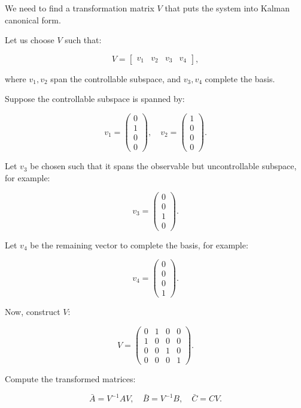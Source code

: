 \documentclass{article}
\begin{document}
We need to find a transformation matrix \( V \) that puts the system into Kalman canonical form.

Let us choose \( V \) such that:

\[
V = \begin{bmatrix}
v_1 & v_2 & v_3 & v_4
\end{bmatrix},
\]

where \( v_1, v_2 \) span the controllable subspace, and \( v_3, v_4 \) complete the basis.

Suppose the controllable subspace is spanned by:

\[
v_1 = \begin{pmatrix}
0 \\ 1 \\ 0 \\ 0
\end{pmatrix}, \quad
v_2 = \begin{pmatrix}
1 \\ 0 \\ 0 \\ 0
\end{pmatrix}.
\]

Let \( v_3 \) be chosen such that it spans the observable but uncontrollable subspace, for example:

\[
v_3 = \begin{pmatrix}
0 \\ 0 \\ 1 \\ 0
\end{pmatrix}.
\]

Let \( v_4 \) be the remaining vector to complete the basis, for example:

\[
v_4 = \begin{pmatrix}
0 \\ 0 \\ 0 \\ 1
\end{pmatrix}.
\]

Now, construct \( V \):

\[
V = \begin{pmatrix}
0 & 1 & 0 & 0 \\
1 & 0 & 0 & 0 \\
0 & 0 & 1 & 0 \\
0 & 0 & 0 & 1
\end{pmatrix}.
\]

Compute the transformed matrices:

\[
\bar{A} = V^{-1} A V, \quad \bar{B} = V^{-1} B, \quad \bar{C} = C V.
\]
\end{document}
